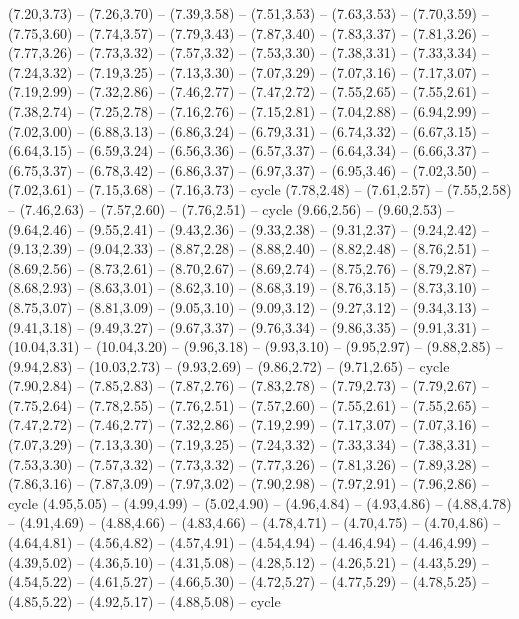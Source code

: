 \expandafter\def\csname geo:gebiet:HRV\endcsname{
  (7.20,3.73) -- (7.26,3.70) -- (7.39,3.58) -- (7.51,3.53) -- (7.63,3.53) -- (7.70,3.59) -- (7.75,3.60) -- (7.74,3.57) -- (7.79,3.43) -- (7.87,3.40) -- (7.83,3.37) -- (7.81,3.26) -- (7.77,3.26) -- (7.73,3.32) -- (7.57,3.32) -- (7.53,3.30) -- (7.38,3.31) -- (7.33,3.34) -- (7.24,3.32) -- (7.19,3.25) -- (7.13,3.30) -- (7.07,3.29) -- (7.07,3.16) -- (7.17,3.07) -- (7.19,2.99) -- (7.32,2.86) -- (7.46,2.77) -- (7.47,2.72) -- (7.55,2.65) -- (7.55,2.61) -- (7.38,2.74) -- (7.25,2.78) -- (7.16,2.76) -- (7.15,2.81) -- (7.04,2.88) -- (6.94,2.99) -- (7.02,3.00) -- (6.88,3.13) -- (6.86,3.24) -- (6.79,3.31) -- (6.74,3.32) -- (6.67,3.15) -- (6.64,3.15) -- (6.59,3.24) -- (6.56,3.36) -- (6.57,3.37) -- (6.64,3.34) -- (6.66,3.37) -- (6.75,3.37) -- (6.78,3.42) -- (6.86,3.37) -- (6.97,3.37) -- (6.95,3.46) -- (7.02,3.50) -- (7.02,3.61) -- (7.15,3.68) -- (7.16,3.73) -- cycle
  (7.78,2.48) -- (7.61,2.57) -- (7.55,2.58) -- (7.46,2.63) -- (7.57,2.60) -- (7.76,2.51) -- cycle}
\expandafter\def\csname geo:gebiet:BGR\endcsname{
  (9.66,2.56) -- (9.60,2.53) -- (9.64,2.46) -- (9.55,2.41) -- (9.43,2.36) -- (9.33,2.38) -- (9.31,2.37) -- (9.24,2.42) -- (9.13,2.39) -- (9.04,2.33) -- (8.87,2.28) -- (8.88,2.40) -- (8.82,2.48) -- (8.76,2.51) -- (8.69,2.56) -- (8.73,2.61) -- (8.70,2.67) -- (8.69,2.74) -- (8.75,2.76) -- (8.79,2.87) -- (8.68,2.93) -- (8.63,3.01) -- (8.62,3.10) -- (8.68,3.19) -- (8.76,3.15) -- (8.73,3.10) -- (8.75,3.07) -- (8.81,3.09) -- (9.05,3.10) -- (9.09,3.12) -- (9.27,3.12) -- (9.34,3.13) -- (9.41,3.18) -- (9.49,3.27) -- (9.67,3.37) -- (9.76,3.34) -- (9.86,3.35) -- (9.91,3.31) -- (10.04,3.31) -- (10.04,3.20) -- (9.96,3.18) -- (9.93,3.10) -- (9.95,2.97) -- (9.88,2.85) -- (9.94,2.83) -- (10.03,2.73) -- (9.93,2.69) -- (9.86,2.72) -- (9.71,2.65) -- cycle}
\expandafter\def\csname geo:gebiet:BIH\endcsname{
  (7.90,2.84) -- (7.85,2.83) -- (7.87,2.76) -- (7.83,2.78) -- (7.79,2.73) -- (7.79,2.67) -- (7.75,2.64) -- (7.78,2.55) -- (7.76,2.51) -- (7.57,2.60) -- (7.55,2.61) -- (7.55,2.65) -- (7.47,2.72) -- (7.46,2.77) -- (7.32,2.86) -- (7.19,2.99) -- (7.17,3.07) -- (7.07,3.16) -- (7.07,3.29) -- (7.13,3.30) -- (7.19,3.25) -- (7.24,3.32) -- (7.33,3.34) -- (7.38,3.31) -- (7.53,3.30) -- (7.57,3.32) -- (7.73,3.32) -- (7.77,3.26) -- (7.81,3.26) -- (7.89,3.28) -- (7.86,3.16) -- (7.87,3.09) -- (7.97,3.02) -- (7.90,2.98) -- (7.97,2.91) -- (7.96,2.86) -- cycle}
\expandafter\def\csname geo:gebiet:BEL\endcsname{
  (4.95,5.05) -- (4.99,4.99) -- (5.02,4.90) -- (4.96,4.84) -- (4.93,4.86) -- (4.88,4.78) -- (4.91,4.69) -- (4.88,4.66) -- (4.83,4.66) -- (4.78,4.71) -- (4.70,4.75) -- (4.70,4.86) -- (4.64,4.81) -- (4.56,4.82) -- (4.57,4.91) -- (4.54,4.94) -- (4.46,4.94) -- (4.46,4.99) -- (4.39,5.02) -- (4.36,5.10) -- (4.31,5.08) -- (4.28,5.12) -- (4.26,5.21) -- (4.43,5.29) -- (4.54,5.22) -- (4.61,5.27) -- (4.66,5.30) -- (4.72,5.27) -- (4.77,5.29) -- (4.78,5.25) -- (4.85,5.22) -- (4.92,5.17) -- (4.88,5.08) -- cycle}
